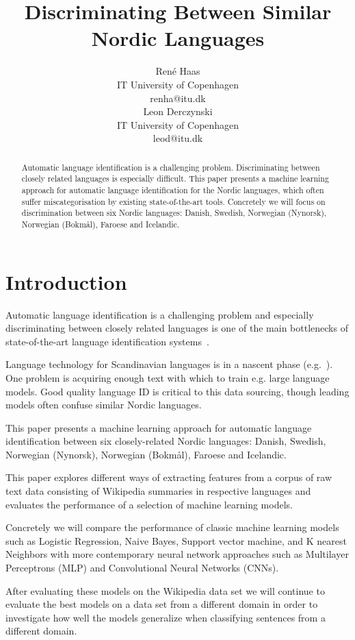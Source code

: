 \documentclass[11pt,a4paper]{article}
\title{Discriminating Between Similar Nordic Languages}
\author{René Haas\\
 IT University of Copenhagen \\
  {\sf renha@itu.dk} \\ \And
  Leon Derczynski\\
 IT University of Copenhagen \\
  {\sf leod@itu.dk} 
}
\begin{document}
\maketitle

\begin{abstract}
Automatic language identification is a challenging problem. Discriminating between closely related languages is especially difficult. This paper presents a machine learning approach for automatic language identification for the Nordic languages, which often suffer miscategorisation by existing state-of-the-art tools. Concretely we will focus on discrimination between six Nordic languages: Danish, Swedish, Norwegian (Nynorsk), Norwegian (Bokmål), Faroese and Icelandic.
\end{abstract}

\section{Introduction}
Automatic language identification is a challenging problem and especially discriminating between closely related languages is one of the main bottlenecks of state-of-the-art language identification systems~\cite{DSL2014}.

Language technology for Scandinavian languages is in a nascent phase (e.g.~). One problem is acquiring enough text with which to train e.g. large language models. Good quality language ID is critical to this data sourcing, though leading models often confuse similar Nordic languages.

This paper presents a machine learning approach for automatic language identification between six closely-related Nordic languages: Danish, Swedish, Norwegian (Nynorsk), Norwegian (Bokmål), Faroese and Icelandic.

This paper explores different ways of extracting features from a corpus of raw text data consisting of Wikipedia summaries in respective languages and evaluates the performance of a selection of machine learning models.

Concretely we will compare the performance of classic machine learning models such as Logistic Regression, Naive Bayes, Support vector machine, and K nearest Neighbors with more contemporary neural network approaches such as Multilayer Perceptrons (MLP) and Convolutional Neural Networks (CNNs).

After evaluating these models on the Wikipedia data set we will continue to evaluate the best models on a data set from a different domain in order to investigate how well the models generalize when classifying sentences from a different domain.
\end{document}
